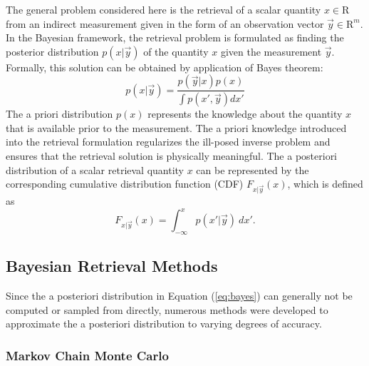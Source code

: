 \documentclass[journal abbreviation, manuscript]{copernicus}
\begin{document}
The general problem considered here is the retrieval of a scalar quantity $x \in
\mathrm{R}$ from an indirect measurement given in the form of an observation
vector $\vec{y} \in \mathrm{R}^m$. In the Bayesian framework, the retrieval
problem is formulated as finding the posterior distribution $p(x | \vec{y})$ of
the quantity $x$ given the measurement $\vec{y}$. Formally, this solution can be
obtained by application of Bayes theorem:
\begin{equation}\label{eq:bayes}
  p(x | \vec{y}) = \frac{p(\vec{y} | x)p(x)}{\int p(x', \vec{y}) dx'}
\end{equation}
The a priori distribution $p(x)$ represents the knowledge about the quantity $x$
that is available prior to the measurement. The a priori knowledge introduced
into the retrieval formulation regularizes the ill-posed inverse problem and
ensures that the retrieval solution is physically meaningful. The a posteriori
distribution of a scalar retrieval quantity $x$ can be represented by the
corresponding cumulative distribution function (CDF) $F_{x | \vec{y}}(x)$,
which is defined as 
\begin{equation}\label{eq:cdf}
F_{x | \vec{y}}(x) = \int_{-\infty}^{x} p(x' | \vec{y}) \: dx'.
\end{equation}

\subsection{Bayesian Retrieval Methods}

Since the a posteriori distribution in Equation (\ref{eq:bayes}) can generally not
be computed or sampled from directly, numerous methods were developed to approximate
 the a posteriori distribution to varying degrees of accuracy. 

\subsubsection{Markov Chain Monte Carlo}
\end{document}
